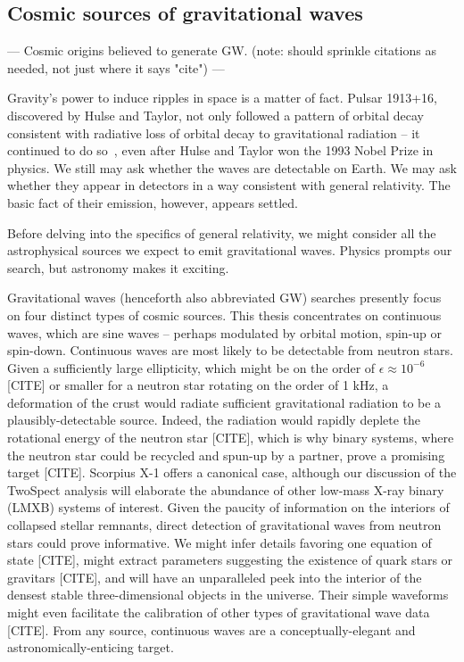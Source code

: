         
        \subsection{Cosmic sources of gravitational waves}
        \label{cosmic_sources}
      
           --- Cosmic origins believed to generate GW. (note: should sprinkle citations as needed, not just where it says "cite") ---

		Gravity's power to induce ripples in space is a matter of fact. Pulsar 1913+16, discovered by Hulse and Taylor, not only followed a pattern of orbital decay consistent with radiative loss of orbital decay to gravitational radiation -- it continued to do so~\cite{WeisbergTaylor2004}, even after Hulse and Taylor won the 1993 Nobel Prize in physics. We still may ask whether the waves are detectable on Earth. We may ask whether they appear in detectors in a way consistent with general relativity. The basic fact of their emission, however, appears settled.

		Before delving into the specifics of general relativity, we might consider all the astrophysical sources we expect to emit gravitational waves. Physics prompts our search, but astronomy makes it exciting.

		Gravitational waves (henceforth also abbreviated GW) searches presently focus on four distinct types of cosmic sources. This thesis concentrates on continuous waves, which are sine waves -- perhaps modulated by orbital motion, spin-up or spin-down. Continuous waves are most likely to be detectable from neutron stars. Given a sufficiently large ellipticity, which might be on the order of $\epsilon \approx 10^{-6}$ [CITE] or smaller for a neutron star rotating on the order of 1 kHz, a deformation of the crust would radiate sufficient gravitational radiation to be a plausibly-detectable source. Indeed, the radiation would rapidly deplete the rotational energy of the neutron star [CITE], which is why binary systems, where the neutron star could be recycled and spun-up by a partner, prove a promising target [CITE]. Scorpius X-1 offers a canonical case, although our discussion of the TwoSpect analysis will elaborate the abundance of other low-mass X-ray binary (LMXB) systems of interest. Given the paucity of information on the interiors of collapsed stellar remnants, direct detection of gravitational waves from neutron stars could prove informative. We might infer details favoring one equation of state [CITE], might extract parameters suggesting the existence of quark stars or gravitars [CITE], and will have an unparalleled peek into the interior of the densest stable three-dimensional objects in the universe. Their simple waveforms might even facilitate the calibration of other types of gravitational wave data [CITE]. From any source, continuous waves are a conceptually-elegant and astronomically-enticing target.

